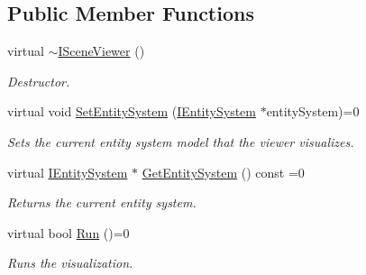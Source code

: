 \subsection*{Public Member Functions}
\begin{DoxyCompactItemize}
\item 
\mbox{\label{classentity__project_1_1ISceneViewer_a5ce3bce5d4764098ec8db47ecd5e4780}} 
virtual \hyperlink{classentity__project_1_1ISceneViewer_a5ce3bce5d4764098ec8db47ecd5e4780}{$\sim$\+I\+Scene\+Viewer} ()
\begin{DoxyCompactList}\small\item\em Destructor. \end{DoxyCompactList}\item 
\mbox{\label{classentity__project_1_1ISceneViewer_ab6c9ee1c8c551dd463e8ff1788b3d407}} 
virtual void \hyperlink{classentity__project_1_1ISceneViewer_ab6c9ee1c8c551dd463e8ff1788b3d407}{Set\+Entity\+System} (\hyperlink{classentity__project_1_1IEntitySystem}{I\+Entity\+System} $\ast$entity\+System)=0
\begin{DoxyCompactList}\small\item\em Sets the current entity system model that the viewer visualizes. \end{DoxyCompactList}\item 
\mbox{\label{classentity__project_1_1ISceneViewer_a1ed816d97624174d415403c3206fa1b6}} 
virtual \hyperlink{classentity__project_1_1IEntitySystem}{I\+Entity\+System} $\ast$ \hyperlink{classentity__project_1_1ISceneViewer_a1ed816d97624174d415403c3206fa1b6}{Get\+Entity\+System} () const =0
\begin{DoxyCompactList}\small\item\em Returns the current entity system. \end{DoxyCompactList}\item 
\mbox{\label{classentity__project_1_1ISceneViewer_a247a0ab155d8fefcbcae2dbb1685ff7f}} 
virtual bool \hyperlink{classentity__project_1_1ISceneViewer_a247a0ab155d8fefcbcae2dbb1685ff7f}{Run} ()=0
\begin{DoxyCompactList}\small\item\em Runs the visualization. \end{DoxyCompactList}\end{DoxyCompactItemize}


